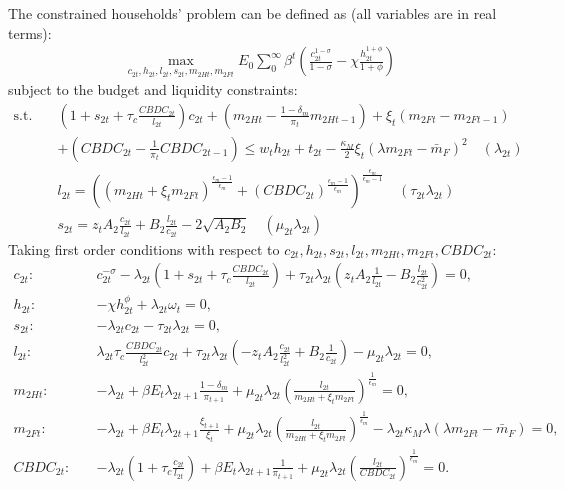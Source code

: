 \documentclass[12pt]{article}
\begin{document}
The constrained households' problem can be defined as (all variables are in real terms):
\begin{align*}
\max_{c_{2t}, h_{2t},l_{2t},s_{2t},m_{2Ht},m_{2Ft}} E_0 \sum_0^{\infty}\beta^t (\frac{c_{2t}^{1-\sigma}}{1-\sigma}-\chi\frac{h_{2t}^{1+\phi}}{1+\phi})
\end{align*}
subject to the budget and liquidity constraints:
\begin{align*} 
\text{s.t.} \quad & (1+s_{2t}+\tau_c\frac{CBDC_{2t}}{l_{2t}})c_{2t}+(m_{2Ht}-\frac{1-\delta_m}{\pi_t}m_{2Ht-1})+\xi_t(m_{2Ft}-m_{2Ft-1})\\
&+(CBDC_{2t}-\frac{1}{\pi_t}CBDC_{2t-1})  \leq w_th_{2t}+t_{2t}-\frac{\kappa_M}{2}\xi_t(\lambda m_{2Ft}-\bar{m}_F)^2  \quad (\lambda_{2t})\\
&l_{2t} = ((m_{2Ht}+\xi_t m_{2Ft})^{\frac{\epsilon_m-1}{\epsilon_m}}+(CBDC_{2t})^{\frac{\epsilon_m-1}{\epsilon_m}})^{\frac{\epsilon_m}{\epsilon_m-1}} \quad (\tau_{2t}\lambda_{2t}) \\
& s_{2t} = z_tA_2\frac{c_{2t}}{l_{2t}}+B_2\frac{l_{2t}}{c_{2t}}-2\sqrt{A_2B_2} \quad (\mu_{2t}\lambda_{2t})
\end{align*}
Taking first order conditions with respect to $c_{2t}, h_{2t}, s_{2t}, l_{2t}, m_{2Ht}, m_{2Ft}, CBDC_{2t}$: 
\begin{align*}
c_{2t}: \quad &c_{2t}^{-\sigma}-\lambda_{2t}(1+s_{2t}+\tau_c\frac{CBDC_{2t}}{l_{2t}})+\tau_{2t}\lambda_{2t}(z_tA_2\frac{1}{l_{2t}}-B_2\frac{l_{2t}}{c_{2t}^2}) = 0, \\
h_{2t}: \quad &-\chi h_{2t}^{\phi}+\lambda_{2t}\omega_t  = 0, \\
s_{2t}: \quad &-\lambda_{2t}c_{2t}-\tau_{2t}\lambda_{2t} = 0, \\
l_{2t}: \quad &\lambda_{2t}\tau_c\frac{CBDC_{2t}}{l_{2t}^2}c_{2t}+\tau_{2t}\lambda_{2t}(-z_tA_2\frac{c_{2t}}{l_{2t}^2}+B_2\frac{1}{c_{2t}})-\mu_{2t}\lambda_{2t} = 0, \\
m_{2Ht}: \quad &-\lambda_{2t}+\beta E_t\lambda_{2t+1}\frac{1-\delta_m}{\pi_{t+1}}+\mu_{2t} \lambda_{2t}(\frac{l_{2t}}{m_{2Ht}+\xi_t m_{2Ft}})^{\frac{1}{\epsilon_m}}= 0, \\
m_{2Ft}: \quad &-\lambda_{2t}+\beta E_t\lambda_{2t+1}\frac{\xi_{t+1}}{\xi_t}+\mu_{2t} \lambda_{2t}(\frac{l_{2t}}{m_{2Ht}+\xi_t m_{2Ft}})^{\frac{1}{\epsilon_m}}-\lambda_{2t}\kappa_M\lambda(\lambda m_{2Ft}-\bar{m}_F) = 0, \\
CBDC_{2t}: \quad &-\lambda_{2t}(1+\tau_c\frac{c_{2t}}{l_{2t}})+\beta E_t\lambda_{2t+1}\frac{1}{\pi_{t+1}}+\mu_{2t} \lambda_{2t}(\frac{l_{2t}}{CBDC_{2t}})^{\frac{1}{\epsilon_m}}= 0.
\end{align*}
\end{document}
